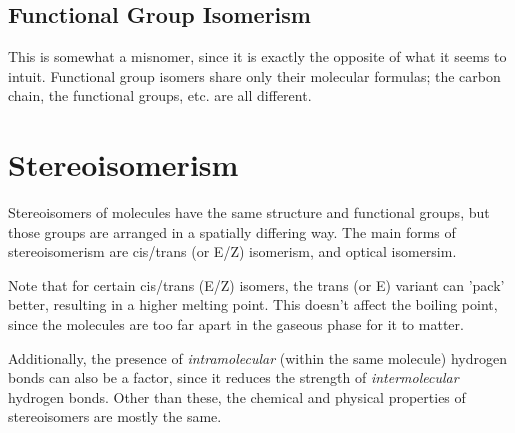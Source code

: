 



		\pagebreak
		\subsection{Functional Group Isomerism}
			This is somewhat a misnomer, since it is exactly the opposite of what it seems to intuit. Functional group isomers
			share only their molecular formulas; the carbon chain, the functional groups, etc. are all different.






	\section{Stereoisomerism}

		Stereoisomers of molecules have the same structure and functional groups, but those groups are arranged in a spatially
		differing way. The main forms of stereoisomerism are cis/trans (or E/Z) isomerism, and optical isomersim.

		Note that for certain cis/trans (E/Z) isomers, the trans (or E) variant can 'pack' better, resulting in a higher melting
		point. This doesn't affect the boiling point, since the molecules are too far apart in the gaseous phase for it to matter.

		Additionally, the presence of \textit{intramolecular} (within the same molecule) hydrogen bonds can also be a factor, since
		it reduces the strength of \textit{intermolecular} hydrogen bonds. Other than these, the chemical and physical properties of
		stereoisomers are mostly the same.


